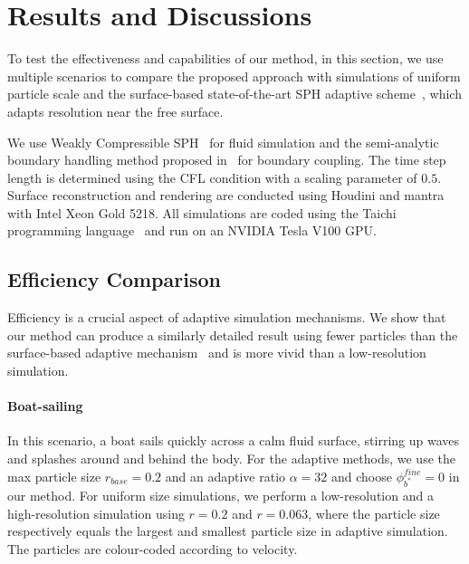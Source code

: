 \documentclass[VANCOUVER,STIX1COL]{WileyNJD-v2}
\begin{document}
\vspace{-1.5\baselineskip}

\section{Results and Discussions}

To test the effectiveness and capabilities of our method, in this section, we use multiple scenarios to compare the proposed approach with simulations of uniform particle scale and the surface-based state-of-the-art SPH adaptive scheme~\cite{Winchenbach17}, which adapts resolution near the free surface.

We use Weakly Compressible SPH~\cite{Becker07} for fluid simulation and the semi-analytic boundary handling method proposed in~\cite{Winchenbach20} for boundary coupling. The time step length is determined using the CFL condition with a scaling parameter of $0.5$. Surface reconstruction and rendering are conducted using Houdini and mantra with Intel Xeon Gold 5218. All simulations are coded using the Taichi programming language~\cite{hu2019taichi} and run on an NVIDIA Tesla V100 GPU.

\subsection{Efficiency Comparison}

Efficiency is a crucial aspect of adaptive simulation mechanisms. We show that our method can produce a similarly detailed result using fewer particles than the surface-based adaptive mechanism~\cite{Winchenbach17} and is more vivid than a low-resolution simulation. 


\paragraph{Boat-sailing}

In this scenario, a boat sails quickly across a calm fluid surface, stirring up waves and splashes around and behind the body. For the adaptive methods, we use the max particle size $r_{base} = 0.2$ and an adaptive ratio $\alpha = 32$ and choose $\phi_{b^*}^{fine} = 0$ in our method. For uniform size simulations, we perform a low-resolution and a high-resolution simulation using $r = 0.2$ and $r = 0.063$, where the particle size respectively equals the largest and smallest particle size in adaptive simulation. The particles are colour-coded according to velocity.
\end{document}
